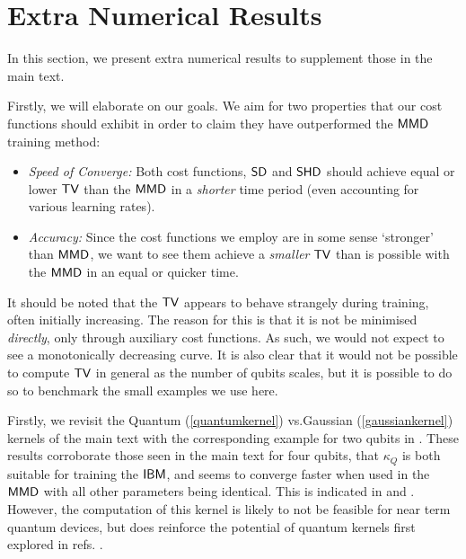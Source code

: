 
\section{Extra Numerical Results \label{supp_matt:numericalresults}}

In this section, we present extra numerical results to supplement those in the main text. 

Firstly, we will elaborate on our goals. We aim for two properties that our cost functions should exhibit in order to claim they have outperformed the $\operatorname{\textsf{MMD}}$ training method:
\begin{itemize}
    \item \textit{Speed of Converge:} Both cost functions, $\operatorname{\textsf{SD}}$ and $\operatorname{\textsf{SHD}}$ should achieve equal or lower $\operatorname{\textsf{TV}}$ than the $\operatorname{\textsf{MMD}}$ in a \textit{shorter} time period (even accounting for various learning rates).
    \item \textit{Accuracy:} Since the cost functions we employ are in some sense `stronger' than $\operatorname{\textsf{MMD}}$, we want to see them achieve a \textit{smaller} $\operatorname{\textsf{TV}}$ than is possible with the $\operatorname{\textsf{MMD}}$ in an equal or quicker time. %
\end{itemize}

It should be noted that the $\operatorname{\textsf{TV}}$ appears to behave strangely during training, often initially increasing. The reason for this is that it is not be minimised \textit{directly}, only through auxiliary cost functions. As such, we would not expect to see a monotonically decreasing curve. It is also clear that it would not be possible to compute $\operatorname{\textsf{TV}}$ in general as the number of qubits scales, but it is possible to do so to benchmark the small examples we use here. 


Firstly, we revisit the Quantum (\eqref{quantumkernel}) vs.\@ Gaussian  (\eqref{gaussiankernel}) kernels of the main text with the corresponding example for two qubits in . These results corroborate those seen in the main text for four qubits, that $\kappa_Q$ is both suitable for training the $\textsf{IBM}$, and seems to converge faster when used in the $\operatorname{\textsf{MMD}}$ with all other parameters being identical. This is indicated in  and . However, the computation of this kernel is likely to not be feasible for near term quantum devices, but does reinforce the potential of quantum kernels first explored in refs. . 

